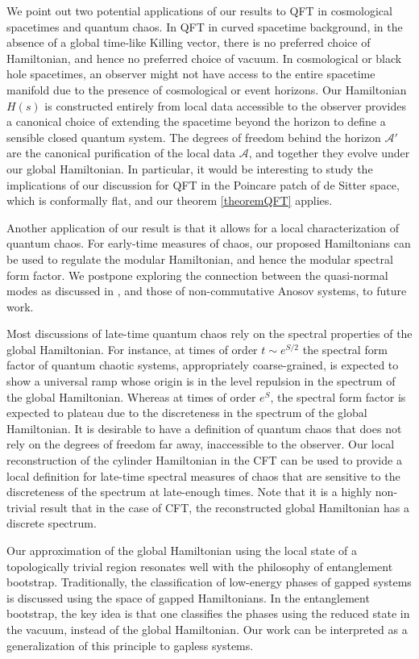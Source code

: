\documentclass[a4paper,11pt]{article}
\theoremstyle{definition}
\newcommand{\mA}{\mathcal{A}}
\begin{document}
We point out two potential applications of our results to QFT in cosmological spacetimes and quantum chaos. In QFT in curved spacetime background, in the absence of a global time-like Killing vector, there is no preferred choice of Hamiltonian, and hence no preferred choice of vacuum. In cosmological or black hole spacetimes, an observer might not have access to the entire spacetime manifold due to the presence of cosmological or event horizons. Our Hamiltonian $H(s)$ is constructed entirely from local data accessible to the observer provides a canonical choice of extending the spacetime beyond the horizon to define a sensible closed quantum system. The degrees of freedom behind the horizon $\mA'$ are the canonical purification of the local data $\mA$, and together they evolve under our global Hamiltonian. In particular, it would be interesting to study the implications of our discussion for QFT in the Poincare patch of de Sitter space, which is conformally flat, and our theorem \ref{theoremQFT} applies.

Another application of our result is that it allows for a local characterization of quantum chaos. For early-time measures of chaos, our proposed Hamiltonians can be used to regulate the modular Hamiltonian, and hence the modular spectral form factor. We postpone exploring the connection between the quasi-normal modes as discussed in \cite{chen2024comments}, and those of non-commutative Anosov systems, to future work. 

Most discussions of late-time quantum chaos rely on the spectral properties of the global Hamiltonian. For instance, at times of order $t\sim e^{S/2}$ the spectral form factor of quantum chaotic systems, appropriately coarse-grained, is expected to show a universal ramp whose origin is in the level repulsion in the spectrum of the global Hamiltonian. Whereas at times of order $e^S$, the spectral form factor is expected to plateau due to the discreteness in the spectrum of the global Hamiltonian. It is desirable to have a definition of quantum chaos that does not rely on the degrees of freedom far away, inaccessible to the observer. Our local reconstruction of the cylinder Hamiltonian in the CFT can be used to provide a local definition for late-time spectral measures of chaos that are sensitive to the discreteness of the spectrum at late-enough times. Note that it is a highly non-trivial result that in the case of CFT, the reconstructed global Hamiltonian has a discrete spectrum.


Our approximation of the global Hamiltonian using the local state of a topologically trivial region resonates well with the philosophy of entanglement bootstrap. Traditionally, the classification of low-energy phases of gapped systems is discussed using the space of gapped Hamiltonians. In the entanglement bootstrap, the key idea is that one classifies the phases using the reduced state in the vacuum, instead of the global Hamiltonian. Our work can be interpreted as a generalization of this principle to gapless systems.
\end{document}
